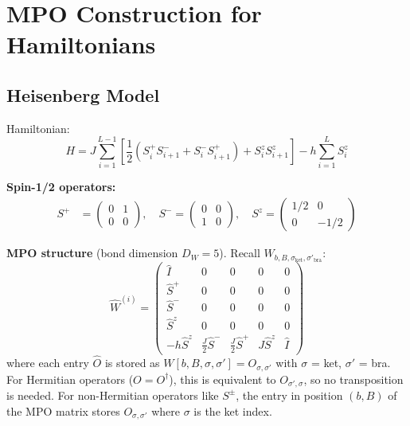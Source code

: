 \documentclass[aps,prb,onecolumn,scriptaddress]{revtex4-2}
\begin{document}
\section{MPO Construction for Hamiltonians}

\subsection{Heisenberg Model}

Hamiltonian:
\begin{equation}
H = J \sum_{i=1}^{L-1} \left[\frac{1}{2}(S_i^+ S_{i+1}^- + S_i^- S_{i+1}^+) + S_i^z S_{i+1}^z\right] - h \sum_{i=1}^L S_i^z
\end{equation}

\textbf{Spin-1/2 operators:}
\begin{align}
S^+ &= \begin{pmatrix} 0 & 1 \\ 0 & 0 \end{pmatrix}, \quad
S^- = \begin{pmatrix} 0 & 0 \\ 1 & 0 \end{pmatrix}, \quad
S^z = \begin{pmatrix} 1/2 & 0 \\ 0 & -1/2 \end{pmatrix}
\end{align}

\textbf{MPO structure} (bond dimension $D_W = 5$). Recall $W_{b,B,\sigma_{\text{ket}},\sigma'_{\text{bra}}}$:
\begin{equation}
\hat{W}^{(i)} = \begin{pmatrix}
	\hat{I} & 0 & 0 & 0 & 0 \\
	\hat{S}^+ & 0 & 0 & 0 & 0 \\
	\hat{S}^- & 0 & 0 & 0 & 0 \\
	\hat{S}^z & 0 & 0 & 0 & 0 \\
	-h\hat{S}^z & \frac{J}{2}\hat{S}^- & \frac{J}{2}\hat{S}^+ & J\hat{S}^z & \hat{I}
\end{pmatrix}
\end{equation}
where each entry $\hat{O}$ is stored as $W[b, B, \sigma, \sigma'] = O_{\sigma, \sigma'}$ with $\sigma$ = ket, $\sigma'$ = bra. For Hermitian operators ($O = O^\dagger$), this is equivalent to $O_{\sigma', \sigma}$, so no transposition is needed. For non-Hermitian operators like $S^\pm$, the entry in position $(b,B)$ of the MPO matrix stores $O_{\sigma,\sigma'}$ where $\sigma$ is the ket index.
\end{document}
